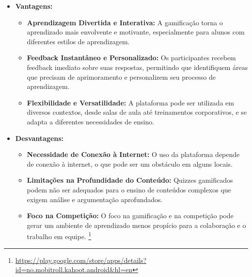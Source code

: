 \begin{enumerate}
    \begin{itemize}
        \item \textbf{Vantagens:}
        \begin{itemize}
            \item \textbf{Aprendizagem Divertida e Interativa:} A gamificação torna o aprendizado mais envolvente e motivante, especialmente para alunos com diferentes estilos de aprendizagem.
            \item \textbf{Feedback Instantâneo e Personalizado:} Os participantes recebem feedback imediato sobre suas respostas, permitindo que identifiquem áreas que precisam de aprimoramento e personalizem seu processo de aprendizagem.
            \item \textbf{Flexibilidade e Versatilidade:} A plataforma pode ser utilizada em diversos contextos, desde salas de aula até treinamentos corporativos, e se adapta a diferentes necessidades de ensino.
        \end{itemize}

        \item \textbf{Desvantagens:}
        \begin{itemize}
            \item \textbf{Necessidade de Conexão à Internet:} O uso da plataforma depende de conexão à internet, o que pode ser um obstáculo em alguns locais.
            \item \textbf{Limitações na Profundidade do Conteúdo:} Quizzes gamificados podem não ser adequados para o ensino de conteúdos complexos que exigem análise e argumentação aprofundados.
            \item \textbf{Foco na Competição:} O foco na gamificação e na competição pode gerar um ambiente de aprendizado menos propício para a colaboração e o trabalho em equipe.
            \footnote{\url{https://play.google.com/store/apps/details?id=no.mobitroll.kahoot.android&hl=en}}
        \end{itemize}
    \end{itemize}
    
\end{enumerate}



 


